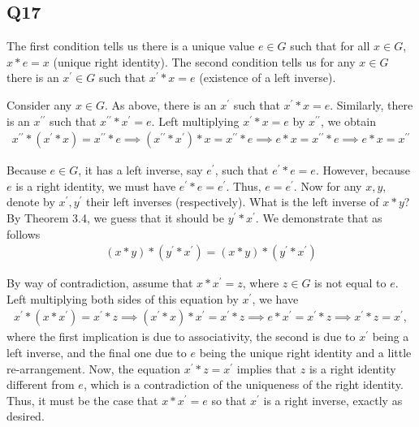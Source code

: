 \documentclass[12pt]{article}
\numberwithin{theorem}{section}
\numberwithin{equation}{section}
\numberwithin{remark}{section}
\numberwithin{definition}{section}
\numberwithin{theorem}{section}
\numberwithin{lemma}{section}
\numberwithin{example}{section}
\begin{document}
\subsection{Q17}

The first condition tells us there is a unique value $e\in G$ such that for all $x\in G$, $x*e=x$ (unique right identity). The second condition tells us for any $x\in G$ there is an $x^\prime\in G$ such that $x^\prime * x = e$ (existence of a left inverse). 

Consider any $x\in G$. As above, there is an $x^\prime$ such that $x^\prime * x = e$. Similarly, there is an $x^{\prime\prime}$ such that $x^{\prime\prime}*x^\prime=e$. Left multiplying $x^\prime * x = e$ by $x^{\prime\prime}$, we obtain
\begin{align*}
	x^{\prime\prime}*(x^\prime* x) = x^{\prime\prime} * e \implies (x^{\prime\prime}*x^\prime)* x = x^{\prime\prime} * e \implies e * x = x^{\prime\prime} * e \implies e * x = x^{\prime\prime}
\end{align*}


Because $e\in G$, it has a left inverse, say $e^\prime$, such that $e^\prime * e = e$. However, because $e$ is a right identity, we must have $e^\prime*e=e^\prime$. Thus, $e=e^\prime$. Now for any $x,y$, denote by $x^\prime,y^\prime$ their left inverses (respectively). What is the left inverse of $x*y$? By Theorem 3.4, we guess that it should be $y^\prime * x^\prime$. We demonstrate that as follows
\begin{align*}
	(x*y)*(y^\prime * x^\prime)=(x*y)*(y^\prime * x^\prime)
\end{align*}

By way of contradiction, assume that $x*x^\prime = z$, where $z\in G$ is not equal to $e$. Left multiplying both sides of this equation by $x^\prime$, we have
\begin{align*}
	x^\prime*(x*x^\prime) = x^\prime*z \implies (x^\prime*x)*x^\prime = x^\prime*z \implies e*x^\prime = x^\prime* z \implies x^\prime * z = x^\prime,
\end{align*}
where the first implication is due to associativity, the second is due to $x^\prime$ being a left inverse, and the final one due to $e$ being the unique right identity and a little re-arrangement. Now, the equation $x^\prime * z = x^\prime$ implies that $z$ is a right identity different from $e$, which is a contradiction of the uniqueness of the right identity. Thus, it must be the case that $x*x^\prime = e$ so that $x^\prime$ is a right inverse, exactly as desired. 
\end{document}
